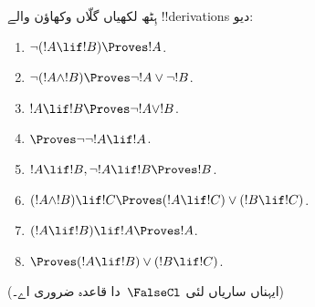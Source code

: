 \documentclass[../../../include/open-logic-section]{subfiles}
\begin{document}
\begin{prob}
ہِٹھ لکھیاں گلّاں وکھاؤن والے !!{derivation}s دیو:
\begin{enumerate}
\item $\lnot(!A \lif !B) \Proves !A$.
\item $\lnot(!A \land !B) \Proves \lnot !A \lor \lnot !B$.
\item $!A \lif !B \Proves \lnot !A \lor !B$.
\item $\Proves \lnot \lnot !A \lif !A$.
\item $!A \lif !B, \lnot !A \lif !B \Proves !B$.
\item $(!A \land !B) \lif !C \Proves (!A \lif !C) \lor (!B \lif !C)$.
\item $(!A \lif !B) \lif !A \Proves !A$.
\item $\Proves (!A \lif !B) \lor (!B \lif !C)$.
\end{enumerate}
(ایہناں ساریاں لئی $\FalseCl$~دا قاعدہ ضروری اے۔)
\end{prob}
\end{document}

